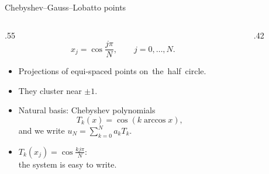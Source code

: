 \begin{frame}{Chebyshev--Gauss--Lobatto points}
    \begin{columns}[c,onlytextwidth]
        \begin{column}{.55\textwidth}
            \[
                x_j = \cos\frac{j\pi}{N}, \qquad j = 0, \dots, N .
            \]
            \begin{itemize}
                \item Projections of equi-spaced points \mbox{on the half circle.}
                \item They cluster near $\pm 1$.
                \item Natural basis: Chebyshev polynomials
                      \[
                          T_k(x) = \cos(k \arccos x),
                      \]
                      and we write $u_N = \sum_{k=0}^N a_k T_k$.
                \item $T_k(x_j) = \cos\frac{kj\pi}{N}$:\\ the system is easy to write.
            \end{itemize}
        \end{column}
        \begin{column}{.42\textwidth}
            \centering
        \end{column}
    \end{columns}
\end{frame}

